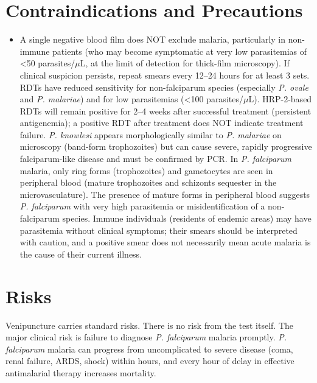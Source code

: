 \section*{Contraindications and Precautions}
\begin{itemize}
  \item A single negative blood film does NOT exclude malaria, particularly in non-immune patients (who may become symptomatic at very low parasitemias of <50 parasites/$\mu$L, at the limit of detection for thick-film microscopy). If clinical suspicion persists, repeat smears every 12--24 hours for at least 3 sets. RDTs have reduced sensitivity for non-falciparum species (especially \textit{P. ovale} and \textit{P. malariae}) and for low parasitemias (<100 parasites/$\mu$L). HRP-2-based RDTs will remain positive for 2--4 weeks after successful treatment (persistent antigenemia); a positive RDT after treatment does NOT indicate treatment failure. \textit{P. knowlesi} appears morphologically similar to \textit{P. malariae} on microscopy (band-form trophozoites) but can cause severe, rapidly progressive falciparum-like disease and must be confirmed by PCR. In \textit{P. falciparum} malaria, only ring forms (trophozoites) and gametocytes are seen in peripheral blood (mature trophozoites and schizonts sequester in the microvasculature). The presence of mature forms in peripheral blood suggests \textit{P. falciparum} with very high parasitemia or misidentification of a non-falciparum species. Immune individuals (residents of endemic areas) may have parasitemia without clinical symptoms; their smears should be interpreted with caution, and a positive smear does not necessarily mean acute malaria is the cause of their current illness.
\end{itemize}
\section*{Risks}
Venipuncture carries standard risks. There is no risk from the test itself. The major clinical risk is failure to diagnose \textit{P. falciparum} malaria promptly. \textit{P. falciparum} malaria can progress from uncomplicated to severe disease (coma, renal failure, ARDS, shock) within hours, and every hour of delay in effective antimalarial therapy increases mortality.

